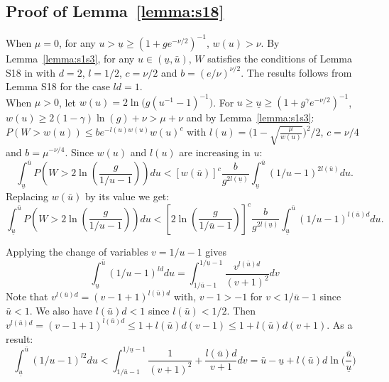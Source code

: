 \documentclass[aos]{imsart}
\theoremstyle{plain}
\begin{document}
\begin{supplement}
\subsection{Proof of Lemma~\ref{lemma:s18}}
 When $\mu=0$, for any $u>\underline{u}\geq(1+ge^{-\nu/2})^{-1}$, $w(u)>\nu$. By Lemma~\ref{lemma:s1s3}, for any $u\in(\underline{u},\bar{u})$, $W$ satisfies the conditions of Lemma S18 in \cite{rossell2022concentration} with $d=2$, $l=1/2$, $c=\nu/2$ and $b=(e/\nu)^{\nu/2}$. The results follows from Lemma S18 for the case $ld=1$.\\

When $\mu>0$, let $w(u)=2\ln\big(g(u^{-1}-1)^{-1}\big)$. For $u\geq\underline{u}\geq(1+g^\gamma e^{-\nu/2})^{-1}$, $w(u)\geq 2(1-\gamma)\ln(g)+\nu>\mu+\nu$ and by Lemma~\ref{lemma:s1s3}: $P(W>w(u)) \leq be^{-l(u) w(u)}w(u)^c$ with  $l(u)=\big(1-\sqrt{\frac{\mu}{w(u)}}\big)^2/2$, $c=\nu/4$ and $b=\mu^{-\nu/4}$. Since $w(u)$ and $l(u)$ are increasing in $u$:
\begin{equation}
    \int_{\underline{u}}^{\bar{u}} P\left(W>2\ln \left(\frac{g}{1 / u-1}\right)\right) d u<\left[w(\bar{u})\right]^c \frac{b}{g^{2l(\underline{u})}} \int_{\underline{u}}^{\bar{u}}(1 / u-1)^{2l(\bar{u})} d u .
\end{equation}
Replacing $w(\bar{u})$ by its value we get:
\begin{equation}\label{eq:random}
    \int_{\underline{u}}^{\bar{u}} P\left(W>2\ln \left(\frac{g}{1 / u-1}\right)\right) d u<\left[2\ln \left(\frac{g}{1 / \bar{u}-1}\right)\right]^c \frac{b}{g^{2l(\underline{u})}} \int_{\underline{u}}^{\bar{u}}(1 / u-1)^{l(\bar{u}) d} d u .
\end{equation}

Applying the change of variables $v=1 / u-1$ gives
$$
\int_{\underline{u}}^{\bar{u}}(1 / u-1)^{l d} d u=\int_{1 / \bar{u}-1}^{1 / \underline{u}-1} \frac{v^{l(\bar{u}) d}}{(v+1)^2} d v
$$
Note that $v^{l(\bar{u}) d}=(v-1 + 1)^{l(\bar{u}) d}$ with, $v-1>-1$ for $v<1 / \bar{u}-1$ since $\bar{u}<1$. We also have $l(\bar{u})d<1$ since $l(\bar{u})<1/2$. Then $v^{l(\bar{u}) d}=(v-1 + 1)^{l(\bar{u}) d}\leq 1 + l(\bar{u})d(v-1)\leq 1 + l(\bar{u})d(v+1)$. As a result:
\begin{equation}\label{eq:random2}
\int_{\underline{u}}^{\bar{u}}(1 / u-1)^{l 2} d u<\int_{1 / \bar{u}-1}^{1 / \underline{u}-1} \frac{1}{(v+1)^2} +\frac{l(\bar{u})d}{v+1} d v = \bar{u}-\underline{u}+l(\bar{u})d\ln\Big(\frac{\bar{u}}{\underline{u}}\Big)
\end{equation}


\end{supplement}
\end{document}
